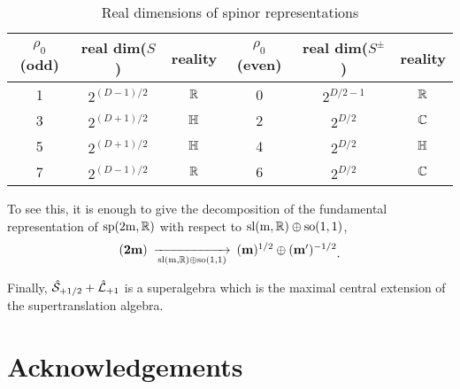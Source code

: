\documentclass[a4paper,12pt]{article}
\begin{document}
\begin{table}[hb]
\begin{center}
\begin{tabular} {|c |c| c||c|c|c|}
\hline $\rho_0$(odd) &real dim($S$) & reality &$\rho_0$(even)
&real dim($S^{\pm}$) & reality\\ \hline \hline 1& $2^{(D-1)/2}$
&$\mathbb{R}$ & 0 &$2^{D/2-1}$&$\mathbb{R}$ \\ \hline 3& $2^{(D+1)/2}$ &$\mathbb{H}$& 2
&$2^{D/2}$&$\mathbb{C}$ \\ \hline 5& $2^{(D+1)/2}$ &$\mathbb{H}$& 4
&$2^{D/2}$&$\mathbb{H}$\\ \hline 7& $2^{(D-1)/2}$ &$\mathbb{R}$ & 6
&$2^{D/2}$&$\mathbb{C}$ \\ \hline
\end{tabular}
\caption{Real dimensions of spinor
representations}\label{dimensions}
\end{center}
\end{table}
\vfill\eject



To see this, it is enough to give the decomposition of the
fundamental representation of $\rm{sp}(2m, \mathbb{R})$ with respect to
$\rm{sl}(m,\mathbb{R})\oplus\rm{so}(1,1)$,
\begin{equation*}
\begin{CD}({\bf 2m})@>>\rm{sl}(m,\R)\oplus\rm{so}(1,1)>({\bf m})^{1/2}\oplus
({\bf m}')^{-1/2}\end{CD}.\end{equation*}

Finally, $\hat{\mathcal{S}}_{+1/2}+\hat{\mathcal{L}}_{+1}$ is a superalgebra which is
the maximal central extension of the supertranslation algebra.

































\section*{Acknowledgements}
\end{document}
